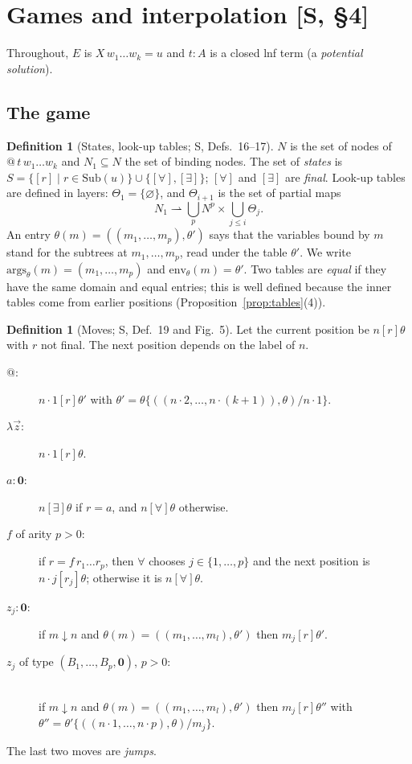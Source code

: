 \documentclass[11pt]{article}
\newcommand{\Ground}{\mathbf{0}}
\newcommand{\Sub}{\mathrm{Sub}}
\newcommand{\bnd}{\mathrel{\downarrow}}
\newcommand{\suc}[2]{#1{\cdot}#2}
\newcommand{\args}{\mathrm{args}}
\newcommand{\env}{\mathrm{env}}
\theoremstyle{plain}
\theoremstyle{definition}
\newtheorem{definition}[theorem]{Definition}
\theoremstyle{remark}
\begin{document}
\section{Games and interpolation [S, \S4]}\label{sec:games}

Throughout, $E$ is $X\,w_1\dots w_k=u$ and $t:A$ is a closed lnf term
(a \emph{potential solution}).

\subsection{The game}

\begin{definition}[States, look-up tables; S, Defs.~16--17]\label{def:tables}
$N$ is the set of nodes of $@\,t\,w_1\dots w_k$ and $N_1\subseteq N$ the
set of binding nodes.  The set of \emph{states} is
$S=\{[r]\mid r\in\Sub(u)\}\cup\{[\forall],[\exists]\}$; $[\forall]$ and
$[\exists]$ are \emph{final}.  Look-up tables are defined in layers:
$\Theta_1=\{\varnothing\}$, and $\Theta_{i+1}$ is the set of partial maps
\[
N_1\rightharpoonup \textstyle\bigcup_p N^p\times\bigcup_{j\le i}\Theta_j .
\]
An entry $\theta(m)=((m_1,\dots,m_p),\theta')$ says that the variables
bound by $m$ stand for the subtrees at $m_1,\dots,m_p$, read under the
table $\theta'$.  We write $\args_\theta(m)=(m_1,\dots,m_p)$ and
$\env_\theta(m)=\theta'$.  Two tables are \emph{equal} if they have the
same domain and equal entries; this is well defined because the inner
tables come from earlier positions (Proposition~\ref{prop:tables}(4)).
\end{definition}

\begin{definition}[Moves; S, Def.~19 and Fig.~5]\label{def:moves}
Let the current position be $n[r]\theta$ with $r$ not final.  The next
position depends on the label of $n$.
\begin{description}
\item[$@$:] $\suc n1[r]\theta'$ with
  $\theta'=\theta\{((\suc n2,\dots,\suc n{(k+1)}),\theta)/\suc n1\}$.
\item[$\lambda\vec z$:] $\suc n1[r]\theta$.
\item[$a:\Ground$:] $n[\exists]\theta$ if $r=a$, and $n[\forall]\theta$
  otherwise.
\item[$f$ of arity $p>0$:] if $r=f\,r_1\dots r_p$, then
  $\forall$ chooses $j\in\{1,\dots,p\}$ and the next position is
  $\suc nj[r_j]\theta$; otherwise it is $n[\forall]\theta$.
\item[$z_j:\Ground$:] if $m\bnd n$ and $\theta(m)=((m_1,\dots,m_l),\theta')$
  then $m_j[r]\theta'$.
\item[$z_j$ of type $(B_1,\dots,B_p,\Ground)$, $p>0$:]\ \\ if $m\bnd n$ and
  $\theta(m)=((m_1,\dots,m_l),\theta')$ then $m_j[r]\theta''$ with
  $\theta''=\theta'\{((\suc n1,\dots,\suc np),\theta)/m_j\}$.
\end{description}
The last two moves are \emph{jumps}.
\end{definition}
\end{document}
